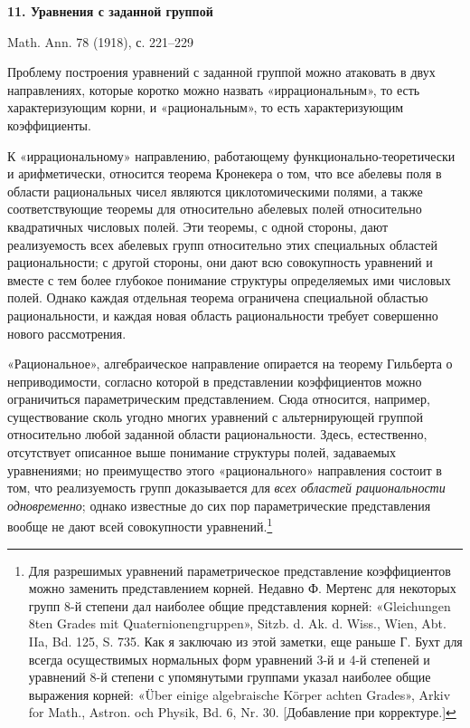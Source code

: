 \documentclass[11pt]{article}
\begin{document}

\begin{center}
{\Large\bfseries 11. Уравнения с заданной группой}\par
\vspace{1.5em}
Math. Ann. 78 (1918), с. 221--229
\end{center}

\vspace{4em}

Проблему построения уравнений с заданной группой можно атаковать в двух направлениях, которые коротко можно назвать «иррациональным», то есть характеризующим корни, и «рациональным», то есть характеризующим коэффициенты.

К «иррациональному» направлению, работающему функционально-теоретически и арифметически, относится теорема Кронекера о том, что все абелевы поля в области рациональных чисел являются циклотомическими полями, а также соответствующие теоремы для относительно абелевых полей относительно квадратичных числовых полей. Эти теоремы, с одной стороны, дают реализуемость всех абелевых групп относительно этих специальных областей рациональности; с другой стороны, они дают всю совокупность уравнений и вместе с тем более глубокое понимание структуры определяемых ими числовых полей. Однако каждая отдельная теорема ограничена специальной областью рациональности, и каждая новая область рациональности требует совершенно нового рассмотрения.

«Рациональное», алгебраическое направление опирается на теорему Гильберта о неприводимости, согласно которой в представлении коэффициентов можно ограничиться параметрическим представлением. Сюда относится, например, существование сколь угодно многих уравнений с альтернирующей группой относительно любой заданной области рациональности. Здесь, естественно, отсутствует описанное выше понимание структуры полей, задаваемых уравнениями; но преимущество этого «рационального» направления состоит в том, что реализуемость групп доказывается для \emph{всех областей рациональности одновременно}; однако известные до сих пор параметрические представления вообще не дают всей совокупности уравнений.\footnote{Для разрешимых уравнений параметрическое представление коэффициентов можно заменить представлением корней. Недавно Ф. Мертенс для некоторых групп 8-й степени дал наиболее общие представления корней: «Gleichungen 8ten Grades mit Quaternionengruppen», Sitzb. d. Ak. d. Wiss., Wien, Abt. IIa, Bd. 125, S. 735. Как я заключаю из этой заметки, еще раньше Г. Бухт для всегда осуществимых нормальных форм уравнений 3-й и 4-й степеней и уравнений 8-й степени с упомянутыми группами указал наиболее общие выражения корней: «Über einige algebraische Körper achten Grades», Arkiv for Math., Astron. och Physik, Bd. 6, Nr. 30. [Добавление при корректуре.]} 
\end{document}
